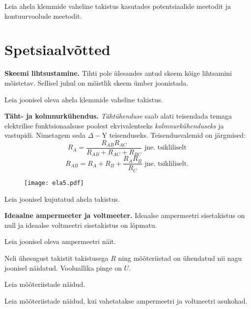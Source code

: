 \documentclass[a4paper,11pt,twocolumn]{article}
\begin{document}
\begin{question}[ela2][5.1cm]
	Leia ahela klemmide vaheline takistus kasutades potentsiaalide meetodit ja kontuurvoolude meetodit.
\end{question}

\section{Spetsiaalvõtted}
\textbf{Skeemi lihtsustamine.} Tihti pole ülesandes antud skeem kõige lihtsamini mõistetav. Sellisel juhul on mõistlik skeem ümber joonistada.
\begin{question}[IPhO 1996, T1][ela1][6.8cm]
	Leia joonisel oleva ahela klemmide vaheline takistus.
\end{question}

\textbf{Täht- ja kolmnurkühendus.} \textit{Tähtühenduse} saab alati teisendada temaga elektrilise funktsionaalsuse poolest ekvivalentseks \textit{kolmnurkühenduseks} ja vastupidi. Nimetagem seda \( \Delta- \)Y teisenduseks. Teisendusvalemid on järgmised: 
\[ R _ { A } = \frac { R _ { A B } R _ { A C } } { R _ { A B } + R _ { A C } + R _ { B C } } \textrm{ jne. tsikliliselt } \]
\[ R _ { A B } = R _ { A } + R _ { B } + \frac { R _ { A } R _ { B } } { R _ { C } } \textrm{ jne. tsikliliselt. } \]

\begin{figure}[h]
	\texttt{[image: ela5.pdf]}	
	\centering
\end{figure}
\begin{question}[ela6][6cm]
	Leia joonisel kujutatud ahela takistus.
\end{question}

\textbf{Ideaalne ampermeeter ja voltmeeter.} Ideaalse ampermeetri sisetakistus on null ja ideaalse voltmeetri sisetakistus on lõpmatu.
\begin{question}[ela3][4.5 cm]
	Leia joonisel oleva ampermeetri näit.
\end{question}
\begin{question}[Lahtine 2015, N5][ela8][4.6 cm]
	Neli ühesugust takistit takistusega \( R \)	ning mõõteriistad on ühendatud nii nagu joonisel näidatud. Vooluallika
	pinge on \( U \).
	\begin{subquestion}
		\item Leia mõõteriistade näidud.
		\item Leia mõõteriistade näidud, kui vahetatakse ampermeetri ja voltmeetri asukohad.
	\end{subquestion}
\end{question}
\end{document}
